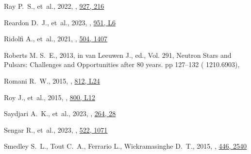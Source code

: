 \documentclass[fleqn,usenatbib]{mnras}
\begin{document}
\begin{thebibliography}{99}
{Ray} P.~S.,  et~al., 2022, , \href {https://ui.adsabs.harvard.edu/abs/2022ApJ...927..216R} {927, 216}

{Reardon} D.~J.,  et~al., 2023, , \href {https://ui.adsabs.harvard.edu/abs/2023ApJ...951L...6R} {951, L6}

{Ridolfi} A.,  et~al., 2021, , \href {https://ui.adsabs.harvard.edu/abs/2021MNRAS.504.1407R} {504, 1407}

{Roberts} M. S.~E.,  2013, in {van Leeuwen} J.,  ed.,  Vol. 291, Neutron Stars and Pulsars: Challenges and Opportunities after 80 years. pp 127--132 ( {1210.6903}), 

{Romani} R.~W.,  2015, , \href {https://ui.adsabs.harvard.edu/abs/2015ApJ...812L..24R} {812, L24}

{Roy} J.,  et~al., 2015, , \href {https://ui.adsabs.harvard.edu/abs/2015ApJ...800L..12R} {800, L12}

{Saydjari} A.~K.,  et~al., 2023, , \href {https://ui.adsabs.harvard.edu/abs/2023ApJS..264...28S} {264, 28}

{Sengar} R.,  et~al., 2023, , \href {https://ui.adsabs.harvard.edu/abs/2023MNRAS.522.1071S} {522, 1071}

{Smedley} S.~L.,  {Tout} C.~A.,  {Ferrario} L.,   {Wickramasinghe} D.~T.,  2015, , \href {https://ui.adsabs.harvard.edu/abs/2015MNRAS.446.2540S} {446, 2540}


\end{thebibliography}
\end{document}
